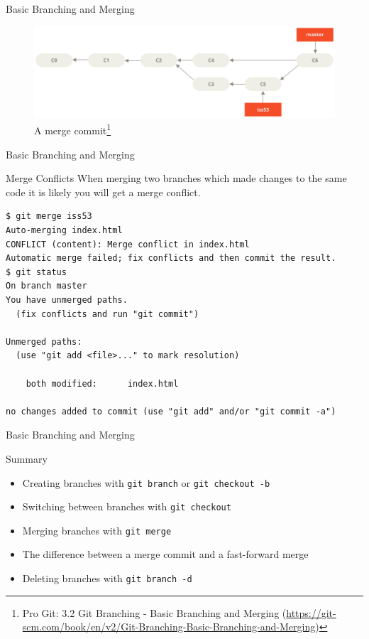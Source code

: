 \documentclass[aspectratio=169]{beamer}
\renewcommand{\footnotesize}{\tiny}
\newcommand{\sectiontitle}{}
\begin{document}
\begin{frame}[fragile]{Basic Branching and Merging}{\sectiontitle}
\begin{figure}
    \centering
    \includegraphics[width=\textwidth,height=0.5\textheight,keepaspectratio]{basic-merging-2}
    \caption{
         A merge commit\footnote{
            Pro Git: 3.2 Git Branching - Basic Branching and Merging
            (\url{https://git-scm.com/book/en/v2/Git-Branching-Basic-Branching-and-Merging})
        }
    }
\end{figure}
\end{frame}

\begin{frame}[fragile]{Basic Branching and Merging}{\sectiontitle}
\begin{block}{Merge Conflicts}
When merging two branches which made changes to the same code it is likely you will get a merge conflict.
\begin{verbatim}
$ git merge iss53
Auto-merging index.html
CONFLICT (content): Merge conflict in index.html
Automatic merge failed; fix conflicts and then commit the result.
$ git status
On branch master
You have unmerged paths.
  (fix conflicts and run "git commit")

Unmerged paths:
  (use "git add <file>..." to mark resolution)

    both modified:      index.html

no changes added to commit (use "git add" and/or "git commit -a")
\end{verbatim}
\end{block}
\end{frame}

\begin{frame}[fragile]{Basic Branching and Merging}{\sectiontitle}
\begin{block}{Summary}
\begin{itemize}
    \item Creating branches with \verb|git branch| or \verb|git checkout -b|
    \item Switching between branches with \verb|git checkout|
    \item Merging branches with \verb|git merge|
    \item The difference between a merge commit and a fast-forward merge
    \item Deleting branches with \verb|git branch -d|
\end{itemize}
\end{block}
\end{frame}
\end{document}
